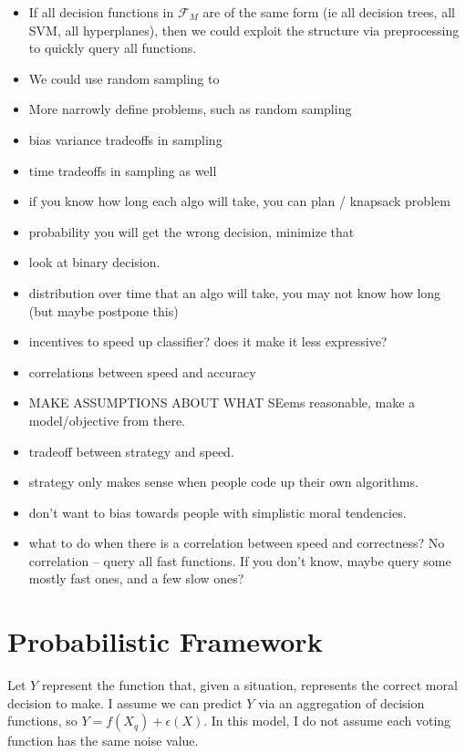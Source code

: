 \documentclass[11pt]{article}
\theoremstyle{definition}
\begin{document}
\begin{itemize}
\item If all decision functions in $\mathcal{F}_M$ are of the same form (ie all decision trees, all SVM, all hyperplanes), then we could exploit the structure via preprocessing to quickly query all functions.

\item We could use random sampling to 

\item More narrowly define problems, such as random sampling

\item bias variance tradeoffs in sampling

\item time tradeoffs in sampling as well

\item if you know how long each algo will take, you can plan / knapsack problem

\item probability you will get the wrong decision, minimize that

\item look at binary decision.

\item distribution over time that an algo will take, you may not know how long (but maybe postpone this)

\item incentives to speed up classifier? does it make it less expressive?

\item correlations between speed and accuracy

\item MAKE ASSUMPTIONS ABOUT WHAT SEems reasonable, make a model/objective from there.

\item tradeoff between strategy and speed.

\item strategy only makes sense when people code up their own algorithms.

\item don't want to bias towards people with simplistic moral tendencies.

\item what to do when there is a correlation between speed and correctness? No correlation -- query all fast functions. If you don't know, maybe query some mostly fast ones, and a few slow ones?

\end{itemize}

\section{Probabilistic Framework}

Let $Y$ represent the function that, given a situation, represents the correct moral decision to make. I assume we can predict $Y$ via an aggregation of decision functions, so $Y = f(X_q) + \epsilon(X)$. In this model, I do not assume each voting function has the same noise value. 
\end{document}
